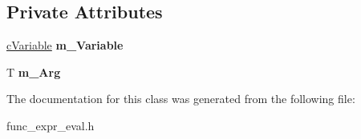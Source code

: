 \subsection*{Private Attributes}
\begin{DoxyCompactItemize}
\item 
\hypertarget{classcEvalVisitor_a5f010c495a0a06a1eb0e48406055fd6e}{\hyperlink{classcVariable}{c\-Variable} {\bfseries m\-\_\-\-Variable}}\label{classcEvalVisitor_a5f010c495a0a06a1eb0e48406055fd6e}

\item 
\hypertarget{classcEvalVisitor_ae506a8872a2a8fd17d6952b816b8b089}{T {\bfseries m\-\_\-\-Arg}}\label{classcEvalVisitor_ae506a8872a2a8fd17d6952b816b8b089}

\end{DoxyCompactItemize}


The documentation for this class was generated from the following file\-:\begin{DoxyCompactItemize}
\item 
func\-\_\-expr\-\_\-eval.\-h\end{DoxyCompactItemize}
